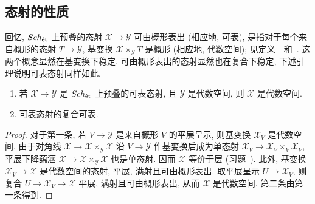 \subsection{态射的性质}\label{src:4.3.1-subsection}
回忆, $Sch_{\text{ét}}$ 上预叠的态射 $\mathcal X\to\mathcal Y$ 可由概形表出 (相应地, 可表), 是指对于每个来自概形的态射 $T\to\mathcal Y$, 基变换 $\mathcal X\times_{\mathcal Y}T$ 是概形 (相应地, 代数空间); 见定义~~和~. 这两个概念显然在基变换下稳定. 可由概形表出的态射显然也在复合下稳定, 下述引理说明可表态射同样如此.
\begin{lemma}\label{src:4.3.1}
\begin{enumerate}[(1)]
\item 若 $\mathcal X\to\mathcal Y$ 是 $Sch_{\text{ét}}$ 上预叠的可表态射, 且 $\mathcal Y$ 是代数空间, 则 $\mathcal X$ 是代数空间.
\item 可表态射的复合可表.
\end{enumerate}
\end{lemma}
\begin{proof}
对于第一条, 若 $V\to\mathcal Y$ 是来自概形 $V$ 的平展呈示, 则基变换 $\mathcal X_V$ 是代数空间. 由于对角线 $\mathcal X\to\mathcal X\times_{\mathcal Y}\mathcal X$ 沿 $V\to\mathcal Y$ 作基变换后成为单态射 $\mathcal X_V\to\mathcal X_V\times_V\mathcal X_V$, 平展下降蕴涵 $\mathcal X\to\mathcal X\times_{\mathcal Y}\mathcal X$ 也是单态射. 因而 $\mathcal X$ 等价于层 (习题~). 此外, 基变换 $\mathcal X_V\to\mathcal X$ 是代数空间的态射, 平展, 满射且可由概形表出. 取平展呈示 $U\to\mathcal X_V$, 则复合 $U\to\mathcal X_V\to\mathcal X$ 平展, 满射且可由概形表出, 从而 $\mathcal X$ 是代数空间. 第二条由第一条得到.
\end{proof}
\newpage
